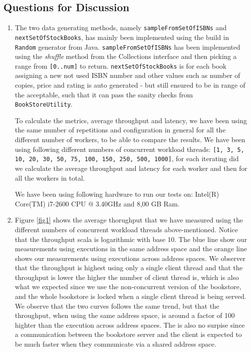 \documentclass[10pt,a4paper]{article}
\begin{document}
\subsection*{Questions for Discussion}
\begin{enumerate}
	\item The two data generating methods, namely \texttt{sampleFromSetOfISBNs} and \texttt{nextSetOfStockBooks}, has mainly been implemented using the build in \texttt{Random} generator from Java. \texttt{sampleFromSetOfISBNs} has been implemented using the \textit{shuffle} method from the Collections interface and then picking a range from \texttt{[0..num]} to return. \texttt{nextSetOfStockBooks} is for each book assigning a new not used ISBN number and other values such as number of copies, price and rating is auto generated - but still ensured to be in range of the acceptable, such that it can pass the sanity checks from \texttt{BookStoreUtility}.
	\newline
	
	To calculate the metrics, average throughput and latency, we have been using the same number of repetitions and configuration in general for all the different number of workers, to be able to compare the results. We have been using following different numbers of concurrent workload threads: \texttt{[1, 3, 5, 10, 20, 30, 50, 75, 100, 150, 250, 500, 1000]}, for each iterating did we calculate the average throughput and latency for each worker and then for all the workers in total.
	\newline
	
	We have been using following hardware to run our tests on: Intel(R) Core(TM) i7-2600 CPU @ 3.40GHz and 8,00 GB Ram.

	\item 
	Figure \ref{fig1} shows the average thorughput that we have measured using the different numbers of concurrent workload threads above-mentioned. Notice that the throughput scala is logarithmic with base 10. The blue line show our measurements using executions in the same address space and the orange line shows our measurements using executions across address spaces. We observer that the throughput is highest using only a single client thread and that the throughput is lower the higher the number of client thread is, which is also what we expected since we use the non-concurrent version of the bookstore, and the whole bookstore is locked when a single client thread is being served. We observe that the two curves follows the same trend, but that the throughput, when using the same address space, is around a factor of 100 highter than the execution across address spaces. The is also no surpise since a communication between the bookstore server and the client is expected to be much faster when they communicate via a shared address space. \\
	

\end{enumerate}
\end{document}

